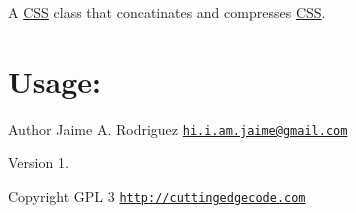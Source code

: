 A \hyperlink{class_c_s_s}{C\-S\-S} class that concatinates and compresses \hyperlink{class_c_s_s}{C\-S\-S}.\hypertarget{nav1_usage}{}\section{Usage\-:}\label{nav1_usage}

\begin{DoxyCode}
\end{DoxyCode}


\begin{DoxyAuthor}{Author}
Jaime A. Rodriguez \href{mailto:hi.i.am.jaime@gmail.com}{\tt hi.\-i.\-am.\-jaime@gmail.\-com} 
\end{DoxyAuthor}
\begin{DoxyVersion}{Version}
1. 
\end{DoxyVersion}
\begin{DoxyCopyright}{Copyright}
G\-P\-L 3 \href{http://cuttingedgecode.com}{\tt http\-://cuttingedgecode.\-com} 
\end{DoxyCopyright}
